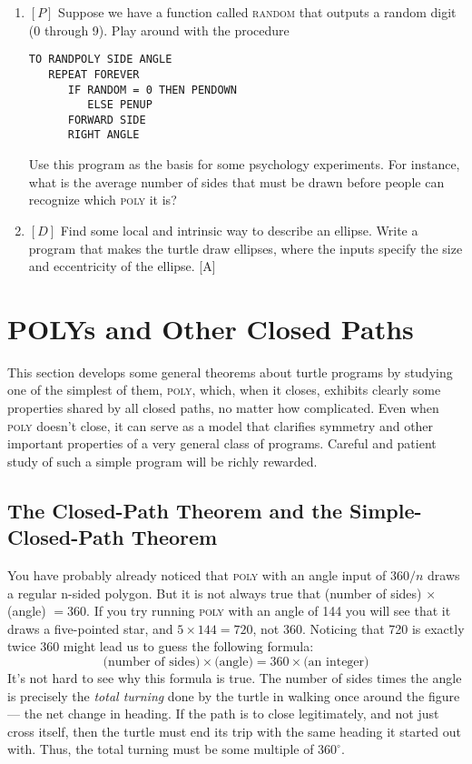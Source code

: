 \documentclass{book}
\begin{document}
\begin{enumerate}
\item $[P]$ Suppose we have a function called \textsc{random} that outputs a random
digit (0 through 9). Play around with the procedure

\begin{verbatim}
TO RANDPOLY SIDE ANGLE
   REPEAT FOREVER
      IF RANDOM = 0 THEN PENDOWN
         ELSE PENUP
      FORWARD SIDE
      RIGHT ANGLE
\end{verbatim}
Use this program as the basis for some psychology experiments. For
instance, what is the average number of sides that must be drawn before
people can recognize which \textsc{poly} it is?
\item $[D]$ Find some local and intrinsic way to describe an ellipse. Write
a program that makes the turtle draw ellipses, where the inputs specify
the size and eccentricity of the ellipse. [A]
\end{enumerate}


\section{POLYs and Other Closed Paths}

This section develops some general theorems about turtle programs by
studying one of the simplest of them, \textsc{poly}, which, when it closes,
exhibits clearly some properties shared by all closed paths, no matter
how complicated. Even when \textsc{poly} doesn't close, it can serve as a model
that clarifies symmetry and other important properties of a very general
class of programs. Careful and patient study of such a simple program
will be richly rewarded.

\subsection{The Closed-Path Theorem and the Simple-Closed-Path Theorem}

You have probably already noticed that \textsc{poly} with an angle input of
$360 / n$ draws a regular n-sided polygon. But it is not always true that
(number of sides) $\times$ (angle) $= 360$. If you try running \textsc{poly} with an angle
of 144 you will see that it draws a five-pointed star, and $5 \times 144 = 720$,
not 360. Noticing that 720 is exactly twice 360 might lead us to guess
the following formula:
$$\text{(number of sides)} \times \text{(angle)} = 360 \times \text{(an integer)}$$
It's not hard to see why this formula is true. The number of sides
times the angle is precisely the {\em total turning} done by the turtle in
walking once around the figure --- the net change in heading. If the
path is to close legitimately, and not just cross itself, then the turtle
must end its trip with the same heading it started out with. Thus,
the total turning must be some multiple of $360^{\circ}$.
\end{document}

